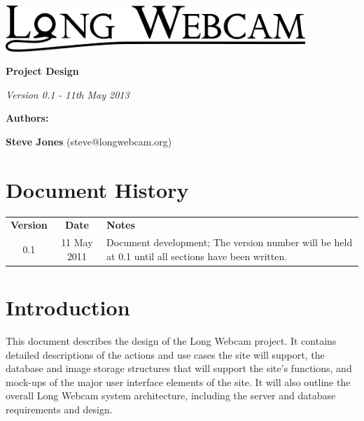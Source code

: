 \documentclass[11pt]{article}
\begin{document}
\begin{titlepage}
\begin{center}

\includegraphics[width=0.85\textwidth]{./Logo_Large-cropped_black.png}

\vspace{3 cm}

\textbf{\Huge{Project Design}}

\vspace{1 cm}

\textit{\large{Version 0.1 - 11th May 2013}}

\vspace{4 cm}

\textbf{\Large{Authors:}}

\textbf{Steve Jones} (steve@longwebcam.org)

\end{center}

\end{titlepage}

\setcounter{tocdepth}{2}
\tableofcontents
\clearpage
{}
\section*{Document History}
\begin{table}[tbhp!]
\begin{tabular}{ c c p{4in} }
\textbf{Version} & \textbf{Date} & \textbf{Notes} \\
0.1 & 11 May 2011 & Document development; The version number will be held at 0.1 until all sections have been written. \\
\end{tabular}
\end{table}


\clearpage
{}

\section{Introduction}
This document describes the design of the Long Webcam project. It contains detailed descriptions of the actions and use cases the site will support, the database and image storage structures that will support the site's functions, and mock-ups of the major user interface elements of the site. It will also outline the overall Long Webcam system architecture, including the server and database requirements and design.
\end{document}
